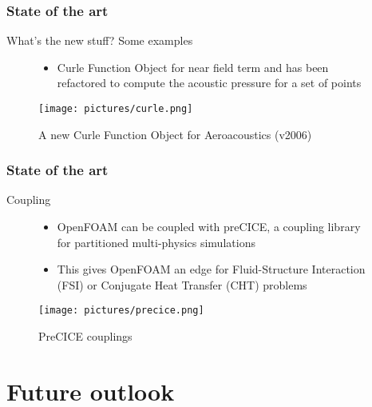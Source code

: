 \documentclass[notheorems, aspectratio=169]{beamer}
\begin{document}
\begin{frame}
\frametitle{State of the art}
What's the new stuff? Some examples
\begin{figure}[!htb]
  \centering
  \begin{minipage}{.4\textwidth}
    \begin{itemize}
      \item Curle Function Object for near field term and has been refactored to compute the acoustic pressure for a set of points
     \end{itemize}
  \end{minipage}%
  \begin{minipage}{0.4\textwidth}
      \centering
      \texttt{[image: pictures/curle.png]}
      \caption{A new Curle Function Object for Aeroacoustics (v2006)}
  \end{minipage}
\end{figure}
  
\end{frame}




\begin{frame}
  \frametitle{State of the art}
  Coupling 
  \begin{figure}[!htb]
    \centering
    \begin{minipage}{.4\textwidth}
      \begin{itemize}
        \item OpenFOAM can be coupled with preCICE, a coupling library for partitioned multi-physics simulations
        \item This gives OpenFOAM an edge for Fluid-Structure Interaction (FSI) or Conjugate Heat Transfer (CHT) problems
       \end{itemize}
    \end{minipage}%
    \begin{minipage}{0.6\textwidth}
        \centering
        \texttt{[image: pictures/precice.png]}
        \caption{PreCICE couplings \citep{bungartz2016precice}}
    \end{minipage}
  \end{figure}
    
  \end{frame}


\section{Future outlook}
\frame{\tableofcontents[currentsection]}
\end{document}
